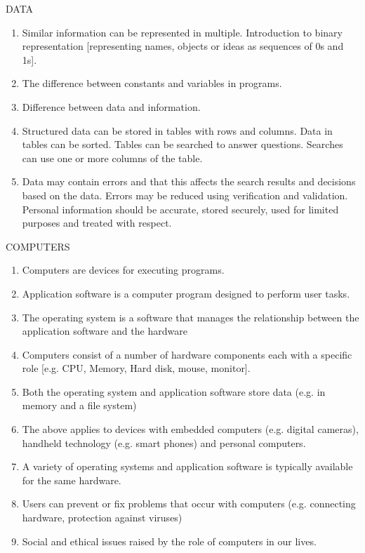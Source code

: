 DATA
\begin{enumerate}
\item Similar information can be represented in multiple.
Introduction to binary representation [representing names, objects or ideas as
sequences of 0s and 1s].
\item The difference between constants and variables in programs.
\item Difference between data and information.
\item Structured data can be stored in tables with rows and columns. Data in tables can be
sorted. Tables can be searched to answer questions. Searches can use one or more
columns of the table.
\item Data may contain errors and that this affects the search results and decisions based
on the data. Errors may be reduced using verification and validation.
Personal information should be accurate, stored securely, used for limited purposes
and treated with respect.
\end{enumerate}

COMPUTERS
\begin{enumerate}
\item Computers are devices for executing programs.
\item Application software is a computer program designed to perform user tasks.
\item The operating system is a software that manages the relationship between the
application software and the hardware
\item Computers consist of a number of hardware components each with a specific role
[e.g. CPU, Memory, Hard disk, mouse, monitor].
\item Both the operating system and application software store data (e.g. in memory and a
file system)
\item The above applies to devices with embedded computers (e.g. digital cameras),
handheld technology (e.g. smart phones) and personal computers.
\item A variety of operating systems and application software is typically available for the
same hardware.
\item Users can prevent or fix problems that occur with computers (e.g. connecting
hardware, protection against viruses)
\item Social and ethical issues raised by the role of computers in our lives.
\end{enumerate}

